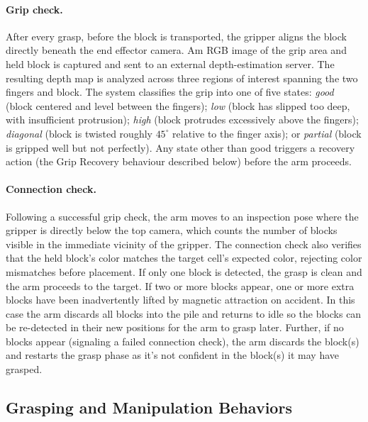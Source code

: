 

\paragraph{Grip check.}
After every grasp, before the block is transported, the gripper aligns the block directly beneath the end effector camera. Am RGB image of the grip area and held block is captured and sent to an external depth-estimation server. The resulting depth map is analyzed across three regions of interest spanning the two fingers and block. The system classifies the grip into one of five states: \emph{good} (block centered and level between the fingers); \emph{low} (block has slipped too deep, with insufficient protrusion); \emph{high} (block protrudes excessively above the fingers); \emph{diagonal} (block is twisted roughly $45^\circ$ relative to the finger axis); or \emph{partial} (block is gripped well but not perfectly). Any state other than good triggers a recovery action (the Grip Recovery behaviour described below) before the arm proceeds.

\paragraph{Connection check.}
Following a successful grip check, the arm moves to an inspection pose where the gripper is directly below the top camera, which counts the number of blocks visible in the immediate vicinity of the gripper. The connection check also verifies that the held block's color matches the target cell's expected color, rejecting color mismatches before placement. If only one block is detected, the grasp is clean and the arm proceeds to the target. If two or more blocks appear, one or more extra blocks have been inadvertently lifted by magnetic attraction on accident. In this case the arm discards all blocks into the pile and returns to idle so the blocks can be re-detected in their new positions for the arm to grasp later. Further, if no blocks appear (signaling a failed connection check), the arm discards the block(s) and restarts the grasp phase as it's not confident in the block(s) it may have grasped.

\subsection{Grasping and Manipulation Behaviors}

